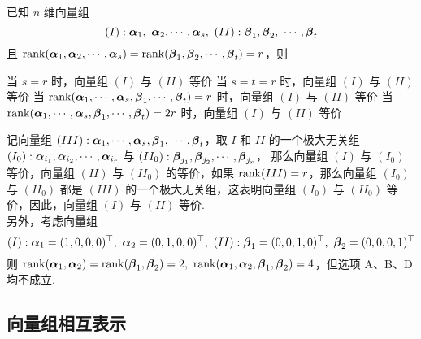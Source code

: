 \begin{example}
    已知 $n$ 维向量组 $$(I):\vb*{\alpha}_1,~\vb*{\alpha}_2,\cdots,\vb*{\alpha}_s,~(II): \vb*{\beta}_1,\vb*{\beta}_2,~\cdots,\vb*{\beta}_t$$
    且 $\rank(\vb*{\alpha}_1,\vb*{\alpha}_2,\cdots,\vb*{\alpha}_s)=\rank(\vb*{\beta}_1,\vb*{\beta}_2,\cdots,\vb*{\beta}_t)=r$，则 
    \begin{tasks}
        \task 当 $s=r$ 时，向量组 $(I)$ 与 $(II)$ 等价
        \task 当 $s=t=r$ 时，向量组 $(I)$ 与 $(II)$ 等价
        \task 当 $\rank(\vb*{\alpha}_1,\cdots,\vb*{\alpha}_s,\vb*{\beta}_1,\cdots,\vb*{\beta}_t)=r$ 时，向量组 $(I)$ 与 $(II)$ 等价
        \task 当 $\rank(\vb*{\alpha}_1,\cdots,\vb*{\alpha}_s,\vb*{\beta}_1,\cdots,\vb*{\beta}_t)=2r$ 时，向量组 $(I)$ 与 $(II)$ 等价
    \end{tasks}
\end{example}
\begin{solution}
    记向量组 $(III):\vb*{\alpha}_1,\cdots,\vb*{\alpha}_s,\vb*{\beta}_1,\cdots,\vb*{\beta}_t$，取 ${I}$ 和 ${II}$ 的一个极大无关组 $(I_0): \vb*{\alpha}_{i_1},\vb*{\alpha}_{i_2},\cdots,\vb*{\alpha}_{i_r}$ 与 $(II_0):\vb*{\beta}_{j_1},\vb*{\beta}_{j_2},\cdots,\vb*{\beta}_{j_r}$，
    那么向量组 $(I)$ 与 $(I_0)$ 等价，向量组 $(II)$ 与 $(II_0)$ 的等价，如果 $\rank(III)=r$，那么向量组 $(I_0)$ 与 $(II_0)$ 都是 $(III)$ 的一个极大无关组，这表明向量组 $(I_0)$ 与 $(II_0)$ 等价，因此，向量组 $(I)$ 与 $(II)$ 等价.\\
    另外，考虑向量组 $$(I):\vb*{\alpha}_1=(1,0,0,0)^\top,~\vb*{\alpha}_2=(0,1,0,0)^\top,~(II):\vb*{\beta}_1=(0,0,1,0)^\top,~\vb*{\beta}_2=(0,0,0,1)^\top$$
    则 $\rank(\vb*{\alpha}_1,\vb*{\alpha}_2)=\rank(\vb*{\beta}_1,\vb*{\beta}_2)=2,~\rank(\vb*{\alpha}_1,\vb*{\alpha}_2,\vb*{\beta}_1,\vb*{\beta}_2)=4$，但选项 A、B、D 均不成立.
\end{solution}

\subsection{向量组相互表示}

